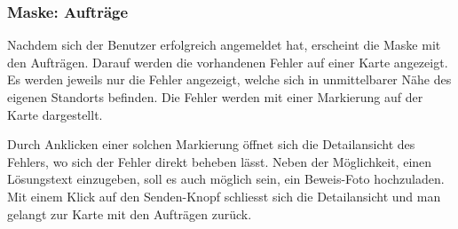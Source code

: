 \begin{figure}[H]
\hfill
{}
\end{figure}

\cleardoublepage
\subsubsection{Maske: Aufträge}
Nachdem sich der Benutzer erfolgreich angemeldet hat, erscheint die Maske mit den Aufträgen.
Darauf werden die vorhandenen Fehler auf einer Karte angezeigt.
Es werden jeweils nur die Fehler angezeigt, welche sich in unmittelbarer Nähe des eigenen Standorts befinden.
Die Fehler werden mit einer Markierung auf der Karte dargestellt.

Durch Anklicken einer solchen Markierung öffnet sich die Detailansicht des Fehlers, wo sich der Fehler direkt beheben lässt.
Neben der Möglichkeit, einen Lösungstext einzugeben, soll es auch möglich sein, ein Beweis-Foto hochzuladen.
Mit einem Klick auf den Senden-Knopf schliesst sich die Detailansicht und man gelangt zur Karte mit den Aufträgen zurück.

